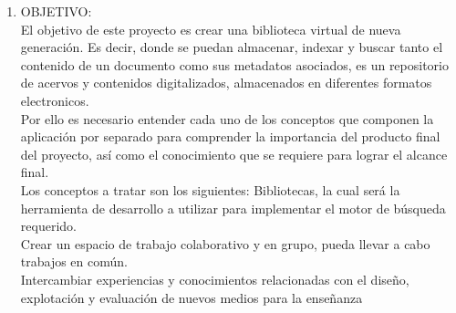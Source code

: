 \begin{enumerate}[1.]
\item OBJETIVO:
\\ El objetivo de este proyecto es crear una biblioteca virtual de nueva generación.
Es decir, donde se puedan almacenar, indexar y buscar tanto el contenido de un documento como sus metadatos asociados, es un repositorio de acervos y contenidos digitalizados, almacenados en diferentes formatos electronicos.
\\ Por ello es necesario entender cada uno de los conceptos que componen la aplicación por separado para comprender la importancia del producto final del 	proyecto, así como el conocimiento que se requiere para lograr el alcance final.
\\ Los conceptos a tratar son los siguientes: Bibliotecas, la cual será la herramienta de desarrollo a utilizar para implementar el motor de búsqueda requerido. 
\\ Crear un espacio de trabajo colaborativo y en grupo, pueda llevar a cabo trabajos en común.
\\ Intercambiar experiencias y conocimientos relacionadas con el diseño, explotación y evaluación de nuevos medios para la enseñanza

\end{enumerate} 
